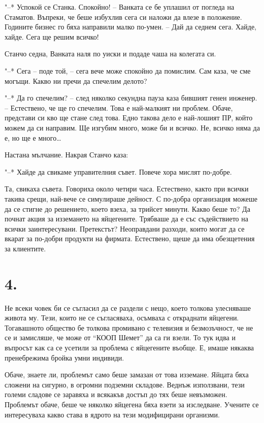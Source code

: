 \documentclass[ebook,openany,12pt]{memoir}
\begin{document}
"--* Успокой се Станка. Спокойно! – Ванката се бе уплашил от погледа на Стаматов. Въпреки, че беше избухлив сега си наложи да влезе в положение. Годините бизнес го бяха направили малко по-умен. – Дай да седнем сега. Хайде, хайде. Сега ще решим всичко!

Станчо седна, Ванката наля по уиски и подаде чаша на колегата си.

"--* Сега – поде той, – сега вече може спокойно да помислим. Сам каза, че сме могъщи. Какво ни пречи да спечелим делото?

"--* Да го спечелим? – след няколко секундна пауза каза бившият генен инженер. – Естествено, че ще го спечелим. Това е най-малкият ни проблем. Обаче, представи си кво ще стане след това. Едно такова дело е най-лошият ПР, който можем да си направим. Ще изгубим много, може би и всичко. Не, всичко няма да е, но ще е много\ldots

Настана мълчание. Накрая Станчо каза:

"--* Хайде да свикаме управителния съвет. Повече хора мислят по-добре.

Та, свикаха съвета. Говориха около четири часа. Естествено, както при всички такива срещи, най-вече се симулираше дейност. С по-добра организация можеше да се стигне до решението, което взеха, за трийсет минути. Какво беше то? Да почнат акция за изземането на яйцегените. Трябваше да е със съдействието на всички заинтересувани. Претекстът? Неоправдани разходи, които могат да се вкарат за по-добри продукти на фирмата. Естествено, щеше да има обезщетения за клиентите.

\section*{4.}

Не всеки човек би се съгласил да се раздели с нещо, което толкова улесняваше живота му. Тези, които не се съгласяваха, осъмваха с откраднати яйцегени. Тогавашното общество бе толкова промивано с телевизия и безмозъчност, че не се и замисляше, че може от ``КООП Шемет'' да са ги взели. То тук идва и въпросът как са се усетили за проблема с яйцегените въобще. Е, имаше някаква пренебрежима бройка умни индивиди.

Обаче, знаете ли, проблемът само беше замазан от това изземане. Яйцата бяха сложени на сигурно, в огромни подземни складове. Веднъж използвани, тези големи сладове се заравяха и всякакъв достъп до тях беше невъзможен. Проблемът обаче, беше че няколко яйцегена бяха взети за изследване. Учените се интересуваха какво става в ядрото на тези модифицирани организми.
\end{document}
